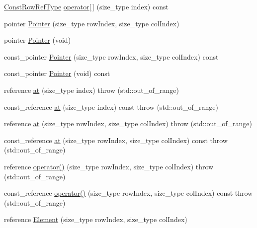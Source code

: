 \begin{DoxyCompactItemize}
\item 
\hyperlink{classvct_fixed_size_const_matrix_base_a74355396eec7437755398c2810e0df41}{Const\-Row\-Ref\-Type} \hyperlink{classvct_fixed_size_matrix_base_ad4b55e1051d0ef6c679a1e48d36e35bd}{operator\mbox{[}$\,$\mbox{]}} (size\-\_\-type index) const 
\item 
pointer \hyperlink{classvct_fixed_size_matrix_base_a44b7f79714b2422d79c95fa501e06d71}{Pointer} (size\-\_\-type row\-Index, size\-\_\-type col\-Index)
\item 
pointer \hyperlink{classvct_fixed_size_matrix_base_a2fcaa16b221230011370f1db37735240}{Pointer} (void)
\item 
const\-\_\-pointer \hyperlink{classvct_fixed_size_matrix_base_a2389d0884f145f2e586f553782160aee}{Pointer} (size\-\_\-type row\-Index, size\-\_\-type col\-Index) const 
\item 
const\-\_\-pointer \hyperlink{classvct_fixed_size_matrix_base_ae617677119a399176af9296a827843b8}{Pointer} (void) const 
\item 
reference \hyperlink{classvct_fixed_size_matrix_base_abf94b9af49a3737c82c76056216c2767}{at} (size\-\_\-type index)  throw (std\-::out\-\_\-of\-\_\-range)
\item 
const\-\_\-reference \hyperlink{classvct_fixed_size_matrix_base_a7df412c941059d0f08155aaddb98df63}{at} (size\-\_\-type index) const   throw (std\-::out\-\_\-of\-\_\-range)
\item 
reference \hyperlink{classvct_fixed_size_matrix_base_a8e97883eb0ed9e92b94e339813312377}{at} (size\-\_\-type row\-Index, size\-\_\-type col\-Index)  throw (std\-::out\-\_\-of\-\_\-range)
\item 
const\-\_\-reference \hyperlink{classvct_fixed_size_matrix_base_a6c5a2adfefb508d4ac0904d6ba0754fd}{at} (size\-\_\-type row\-Index, size\-\_\-type col\-Index) const   throw (std\-::out\-\_\-of\-\_\-range)
\item 
reference \hyperlink{classvct_fixed_size_matrix_base_ac52c39af5e05d2b50b3d07a552ef3640}{operator()} (size\-\_\-type row\-Index, size\-\_\-type col\-Index)  throw (std\-::out\-\_\-of\-\_\-range)
\item 
const\-\_\-reference \hyperlink{classvct_fixed_size_matrix_base_a62fcc044ff6fb34e194f0d3e138ac148}{operator()} (size\-\_\-type row\-Index, size\-\_\-type col\-Index) const   throw (std\-::out\-\_\-of\-\_\-range)
\item 
reference \hyperlink{classvct_fixed_size_matrix_base_af5902e2612c32f77f8db2d774957a378}{Element} (size\-\_\-type row\-Index, size\-\_\-type col\-Index)

\end{DoxyCompactItemize}
